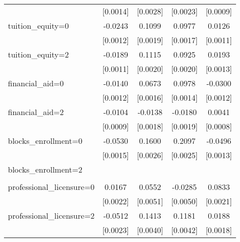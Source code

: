 \begin{table}[htbp]
\begin{tabular}{l*{4}{c}}
                    &    [0.0014]         &    [0.0028]         &    [0.0023]         &    [0.0009]         \\
\addlinespace
tuition\_equity=0    &     -0.0243\sym{***}&      0.1099\sym{***}&      0.0977\sym{***}&      0.0126\sym{***}\\
                    &    [0.0012]         &    [0.0019]         &    [0.0017]         &    [0.0011]         \\
\addlinespace
tuition\_equity=2    &     -0.0189\sym{***}&      0.1115\sym{***}&      0.0925\sym{***}&      0.0193\sym{***}\\
                    &    [0.0011]         &    [0.0020]         &    [0.0020]         &    [0.0013]         \\
\addlinespace
financial\_aid=0     &     -0.0140\sym{***}&      0.0673\sym{***}&      0.0978\sym{***}&     -0.0300\sym{***}\\
                    &    [0.0012]         &    [0.0016]         &    [0.0014]         &    [0.0012]         \\
\addlinespace
financial\_aid=2     &     -0.0104\sym{***}&     -0.0138\sym{***}&     -0.0180\sym{***}&      0.0041\sym{***}\\
                    &    [0.0009]         &    [0.0018]         &    [0.0019]         &    [0.0008]         \\
\addlinespace
blocks\_enrollment=0 &     -0.0530\sym{***}&      0.1600\sym{***}&      0.2097\sym{***}&     -0.0496\sym{***}\\
                    &    [0.0015]         &    [0.0026]         &    [0.0025]         &    [0.0013]         \\
\addlinespace
blocks\_enrollment=2 &                     &                     &                     &                     \\
                    &                     &                     &                     &                     \\
\addlinespace
professional\_licensure=0&      0.0167\sym{***}&      0.0552\sym{***}&     -0.0285\sym{***}&      0.0833\sym{***}\\
                    &    [0.0022]         &    [0.0051]         &    [0.0050]         &    [0.0021]         \\
\addlinespace
professional\_licensure=2&     -0.0512\sym{***}&      0.1413\sym{***}&      0.1181\sym{***}&      0.0188\sym{***}\\
                    &    [0.0023]         &    [0.0040]         &    [0.0042]         &    [0.0018]         \\

\end{tabular}
\end{table}
